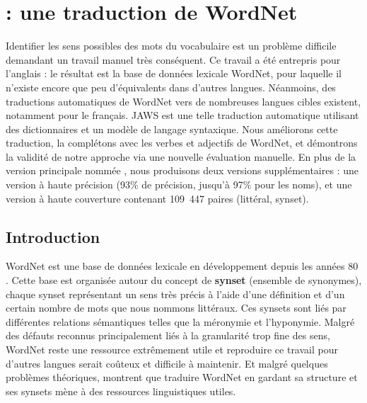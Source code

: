 \chapter{\newjaws{} : une traduction de WordNet}
\label{ch:wonef} 

Identifier les sens possibles des mots du vocabulaire est un problème difficile demandant un travail manuel très conséquent. Ce travail a été entrepris pour l'anglais : le résultat est la base de données lexicale WordNet, pour laquelle il n'existe encore que peu d'équivalents dans d'autres langues. Néanmoins, des traductions automatiques de WordNet vers de nombreuses langues cibles existent, notamment pour le français. JAWS est une telle traduction automatique utilisant des dictionnaires et un modèle de langage syntaxique. Nous améliorons cette traduction, la complétons avec les verbes et adjectifs de WordNet, et démontrons la validité de notre approche via une nouvelle évaluation manuelle. En plus de la version principale nommée \newjaws{}, nous produisons deux versions supplémentaires : une version à haute précision (93\% de précision, jusqu'à 97\% pour les noms), et une version à haute couverture contenant 109~447 paires (littéral, synset).


\section{Introduction}
\label{sec:intro}

WordNet est une base de données lexicale en développement depuis les années 80 \citep{fellbaum98wordnet}. Cette base est organisée autour du concept de \textbf{synset} (ensemble de synonymes), chaque synset représentant un sens très précis à l'aide d'une définition et d'un certain nombre de mots que nous nommons littéraux. Ces synsets sont liés par différentes relations sémantiques telles que la méronymie et l'hyponymie. Malgré des défauts reconnus \citep{boyd2006adding} principalement liés à la granularité trop fine des sens, WordNet reste une ressource extrêmement utile et reproduire ce travail pour d'autres langues serait coûteux et difficile à maintenir. Et malgré quelques problèmes théoriques, \cite{fellbaum2007connecting,demelo2008utility} montrent que traduire WordNet en gardant sa structure et ses synsets mène à des ressources linguistiques utiles.

